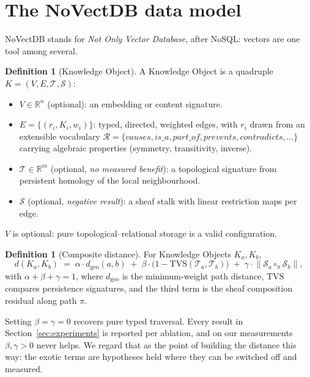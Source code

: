 \documentclass[11pt]{article}
\theoremstyle{definition}
\newtheorem{definition}[theorem]{Definition}
\begin{document}
\section{The NoVectDB data model}
\label{sec:paradigm}

NoVectDB stands for \emph{Not Only Vector Database}, after NoSQL: vectors are one tool
among several.

\begin{definition}[Knowledge Object]
A Knowledge Object is a quadruple $K=(V,E,\mathcal{T},\mathcal{S})$:
\begin{itemize}
  \item $V\in\mathbb{R}^n$ (optional): an embedding or content signature.
  \item $E=\{(r_i,K_i,w_i)\}$: typed, directed, weighted edges, with $r_i$ drawn from
  an extensible vocabulary $\mathcal{R}=\{\textit{causes}, \textit{is\_a},
  \textit{part\_of}, \textit{prevents}, \textit{contradicts},\dots\}$ carrying
  algebraic properties (symmetry, transitivity, inverse).
  \item $\mathcal{T}\in\mathbb{R}^m$ (optional, \emph{no measured benefit}): a
  topological signature from persistent homology of the local neighbourhood.
  \item $\mathcal{S}$ (optional, \emph{negative result}): a sheaf stalk with linear
  restriction maps per edge.
\end{itemize}
$V$ is optional: pure topological--relational storage is a valid configuration.
\end{definition}

\begin{definition}[Composite distance]
\label{def:distance}
For Knowledge Objects $K_a,K_b$,
\begin{equation}
  d(K_a,K_b) \;=\; \alpha\cdot d_{\mathrm{geo}}(a,b)
  \;+\; \beta\cdot\bigl(1-\mathrm{TVS}(\mathcal{T}_a,\mathcal{T}_b)\bigr)
  \;+\; \gamma\cdot\lVert \mathcal{S}_a \circ_\pi \mathcal{S}_b \rVert,
  \label{eq:distance}
\end{equation}
with $\alpha+\beta+\gamma=1$, where $d_{\mathrm{geo}}$ is the minimum-weight path
distance, $\mathrm{TVS}$ compares persistence signatures, and the third term is the
sheaf composition residual along path $\pi$.
\end{definition}

Setting $\beta=\gamma=0$ recovers pure typed traversal. Every result in
Section~\ref{sec:experiments} is reported per ablation, and on our measurements
$\beta,\gamma>0$ never helps. We regard that as the point of building the distance this
way: the exotic terms are hypotheses held where they can be switched off and measured.
\end{document}
